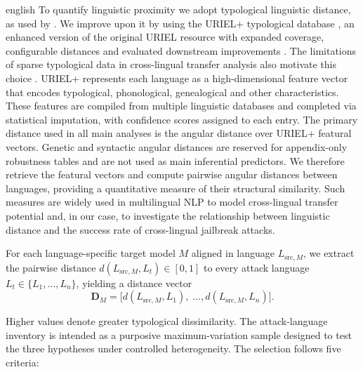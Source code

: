 \begin{otherlanguage*}{english}
To quantify linguistic proximity we adopt typological linguistic distance, as used by \textcite{philippyIdentifyingCorrelationLanguage2023}. We improve upon it by using the URIEL+ typological database \cite{khan-etal-2025-uriel}, an enhanced version of the original URIEL resource \cite{littell-etal-2017-uriel} with expanded coverage, configurable distances and evaluated downstream improvements \cite{khan-etal-2025-uriel}. The limitations of sparse typological data in cross-lingual transfer analysis also motivate this choice \cite{khiu-etal-2024-predicting}. URIEL+ represents each language as a high-dimensional feature vector that encodes typological, phonological, genealogical and other characteristics. These features are compiled from multiple linguistic databases and completed via statistical imputation, with confidence scores assigned to each entry. The primary distance used in all main analyses is the angular distance over URIEL+ featural vectors. Genetic and syntactic angular distances are reserved for appendix-only robustness tables and are not used as main inferential predictors. We therefore retrieve the featural vectors and compute pairwise angular distances between languages, providing a quantitative measure of their structural similarity. Such measures are widely used in multilingual NLP to model cross-lingual transfer potential and, in our case, to investigate the relationship between linguistic distance and the success rate of cross-lingual jailbreak attacks.

For each language-specific target model $M$ aligned in language $L_{\mathrm{src},M}$, we extract the pairwise distance 
$d(L_{\mathrm{src},M}, L_t) \in [0,1]$ to every attack language $L_t \in \{L_1,\dots,L_n\}$, yielding a distance vector
\begin{equation}
\mathbf{D}_M = \bigl[d(L_{\mathrm{src},M},L_1),\; \dots,
d(L_{\mathrm{src},M},L_n)\bigr].
\label{eq:distance-vector}
\end{equation}

Higher values denote greater typological dissimilarity. The attack-language inventory is intended as a purposive maximum-variation sample designed to test the three hypotheses under controlled heterogeneity. The selection follows five criteria:


\end{otherlanguage*}
